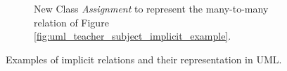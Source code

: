 \begin{figure}[!ht]
\begin{subfigure}[b]{0.47\textwidth}
{
    }
    \caption{New Class \textit{Assignment} to represent the many-to-many relation of Figure \ref{fig:uml_teacher_subject_implicit_example}.}
    \label{fig:uml_teacher_new_class}
    \end{subfigure}
    \caption{Examples of implicit relations and their representation in UML.}
\end{figure}